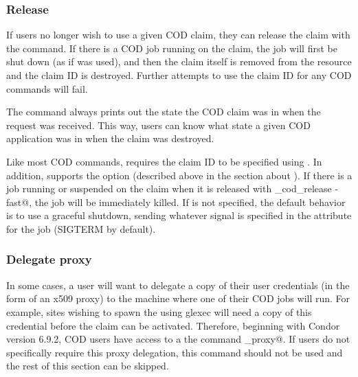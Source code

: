 \subsubsection{\label{sec:cod-claim-release}Release}

If users no longer wish to use a given COD claim,
they can release the claim with the  command.
If there is a COD job running on the claim,
the job will first be shut down (as if  was
used),
and then the claim itself is removed from the resource and the claim
ID is destroyed. 
Further attempts to use the claim ID for any COD commands will fail.

The  command always prints out the state the
COD claim was in when the request was received.
This way, users can know what state a given COD application was in
when the claim was destroyed.

Like most COD commands,  requires the claim ID to
be specified using .
In addition,  supports the  option
(described above in the section about ).
If there is a job running or suspended on the claim when it is
released with \verb@condor_cod_release -fast@, the job will be
immediately killed. 
If  is not specified, the default behavior is to use a
graceful shutdown, sending whatever signal is specified in the
 attribute for the job (SIGTERM by default).


\subsubsection{\label{sec:cod-claim-delegate}Delegate proxy}

In some cases, a user will want to delegate a copy of their user
credentials (in the form of an x509 proxy) to the machine where one of
their COD jobs will run.
For example, sites wishing to spawn the  using glexec
will need a copy of this credential before the claim can be activated.
Therefore, beginning with Condor version 6.9.2, COD users have access
to a the command \verb@delegate_proxy@.
If users do not specifically require this proxy delegation, this
command should not be used and the rest of this section can be skipped.

